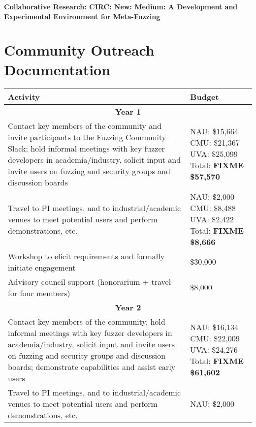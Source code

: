 \documentclass[12pt]{article}
\begin{document}
\begin{center} {\Large\sf\textbf{Collaborative Research: CIRC: New: Medium: A
      Development and Experimental Environment for Meta-Fuzzing}}
\end{center}

\section*{Community Outreach Documentation}


\begin{table}
  \begin{tabular}{|p{12cm}|p{3cm}|}
    \hline
    {\bf Activity} & {\bf Budget} \\
    \hline 
    \multicolumn{2}{c}{{\bf Year 1}} \\
    \hline
    Contact key members of the community and invite participants to the
    Fuzzing Community Slack; hold informal meetings with
    key fuzzer developers in academia/industry, solicit input and
    invite users
    on fuzzing and security groups and discussion boards &  NAU: \$15,664 CMU: \$21,367  UVA: \$25,099
                                                      Total: \textbf{FIXME \$57,570} \\
    \hline
    Travel to PI meetings, and to industrial/academic venues to meet
    potential users and perform demonstrations, etc. & NAU: \$2,000
                                                       CMU: \$8,488 UVA:
                                                       \$2,422 Total: \textbf{FIXME \$8,666}\\
    \hline
    Workshop to elicit requirements and formally initiate engagement
& \$30,000 \\
    \hline 
    Advisory council support (honorarium + travel for four members) 
  & \$8,000 \\
    \hline
    \hline
    \multicolumn{2}{c}{{\bf Year 2}} \\
    \hline
    \hline
    Contact key members of the community, hold informal meetings with
    key fuzzer developers in academia/industry, solicit input and
    invite users
    on fuzzing and security groups and discussion boards; demonstrate
    capabilities and assist early users&  NAU:  \$16,134 CMU:  \$22,009 UVA: \$24,276
                                                      Total: \textbf{FIXME \$61,602}  \\
    \hline
    Travel to PI meetings, and to industrial/academic venues to meet
    potential users and perform demonstrations, etc. & NAU: \$2,000

\end{tabular}
\end{table}
\end{document}

